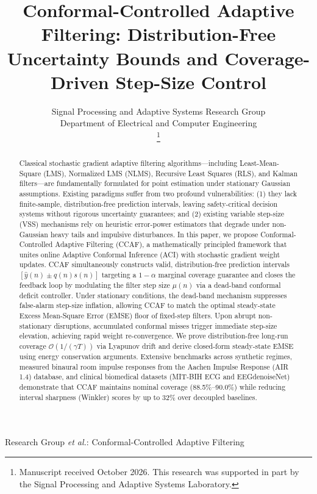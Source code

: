 \documentclass[journal,twocolumn]{IEEEtran}
\begin{document}
\title{Conformal-Controlled Adaptive Filtering: Distribution-Free Uncertainty Bounds and Coverage-Driven Step-Size Control}

\author{Signal Processing and Adaptive Systems Research Group\\
Department of Electrical and Computer Engineering\\
\thanks{Manuscript received October 2026. This research was supported in part by the Signal Processing and Adaptive Systems Laboratory.}
}

%
{Research Group \MakeLowercase{\textit{et al.}}: Conformal-Controlled Adaptive Filtering}

\maketitle

\begin{abstract}
Classical stochastic gradient adaptive filtering algorithms---including Least-Mean-Square (LMS), Normalized LMS (NLMS), Recursive Least Squares (RLS), and Kalman filters---are fundamentally formulated for point estimation under stationary Gaussian assumptions. Existing paradigms suffer from two profound vulnerabilities: (1) they lack finite-sample, distribution-free prediction intervals, leaving safety-critical decision systems without rigorous uncertainty guarantees; and (2) existing variable step-size (VSS) mechanisms rely on heuristic error-power estimators that degrade under non-Gaussian heavy tails and impulsive disturbances. In this paper, we propose Conformal-Controlled Adaptive Filtering (CCAF), a mathematically principled framework that unites online Adaptive Conformal Inference (ACI) with stochastic gradient weight updates. CCAF simultaneously constructs valid, distribution-free prediction intervals $[\hat{y}(n) \pm q(n)s(n)]$ targeting a $1-\alpha$ marginal coverage guarantee and closes the feedback loop by modulating the filter step size $\mu(n)$ via a dead-band conformal deficit controller. Under stationary conditions, the dead-band mechanism suppresses false-alarm step-size inflation, allowing CCAF to match the optimal steady-state Excess Mean-Square Error (EMSE) floor of fixed-step filters. Upon abrupt non-stationary disruptions, accumulated conformal misses trigger immediate step-size elevation, achieving rapid weight re-convergence. We prove distribution-free long-run coverage $\mathcal{O}(1/(\gamma T))$ via Lyapunov drift and derive closed-form steady-state EMSE using energy conservation arguments. Extensive benchmarks across synthetic regimes, measured binaural room impulse responses from the Aachen Impulse Response (AIR 1.4) database, and clinical biomedical datasets (MIT-BIH ECG and EEGdenoiseNet) demonstrate that CCAF maintains nominal coverage (88.5\%--90.0\%) while reducing interval sharpness (Winkler) scores by up to 32\% over decoupled baselines.
\end{abstract}
\end{document}
